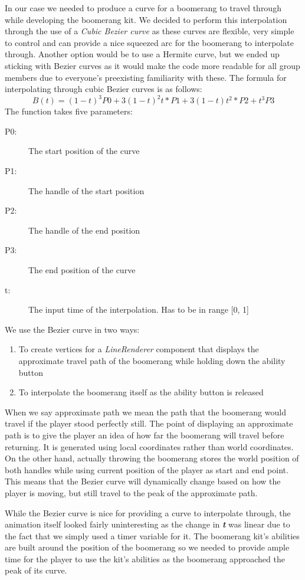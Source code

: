In our case we needed to produce a curve for a boomerang to travel through while developing the boomerang kit. We decided to perform this interpolation through the use of a \emph{Cubic Bezier curve} as these curves are flexible, very simple to control and can provide a nice squeezed arc for the boomerang to interpolate through. Another option would be to use a Hermite curve, but we ended up sticking with Bezier curves as it would make the code more readable for all group members due to everyone's preexisting familiarity with these. The formula for interpolating through cubic Bezier curves is as follows:
$$
B(t) = (1 - t)^3 P0 + 3(1 - t)^2 t * P1 + 3(1 - t)t^2 * P2 + t^3 P3 
$$
The function takes five parameters:
\begin{description}
    \item[P0:] The start position of the curve
    \item[P1:] The handle of the start position
    \item[P2:] The handle of the end position
    \item[P3:] The end position of the curve
    \item[t:]  The input time of the interpolation. Has to be in range [0, 1]
\end{description}

We use the Bezier curve in two ways:
\begin{enumerate}
    \item To create vertices for a \emph{LineRenderer} component that displays the approximate travel path of the boomerang while holding down the ability button
    \item To interpolate the boomerang itself as the ability button is released
\end{enumerate}
When we say approximate path we mean the path that the boomerang would travel if the player stood perfectly still.
The point of displaying an approximate path is to give the player an idea of how far the boomerang will travel before returning. It is generated using local coordinates rather than world coordinates. On the other hand, actually throwing the boomerang stores the world position of both handles while using current position of the player as start and end point. This means that the Bezier curve will dynamically change based on how the player is moving, but still travel to the peak of the approximate path.  

While the Bezier curve is nice for providing a curve to interpolate through, the animation itself looked fairly uninteresting as the change in \textbf{\textit{t}} was linear due to the fact that we simply used a timer variable for it. The boomerang kit's abilities are built around the position of the boomerang so we needed to provide ample time for the player to use the kit's abilities as the boomerang approached the peak of its curve. 

